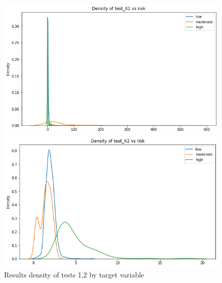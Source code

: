 \documentclass[a4paper]{article}
\begin{document}
\begin{figure}[ht]
\begin{minipage}[b]{0.45\linewidth}
\centering
\includegraphics[width=\textwidth]{Materials//Density Plots/test1.png}
\end{minipage}
\hspace{0.25cm}
\begin{minipage}[b]{0.45\linewidth}
\centering
\includegraphics[width=\textwidth]{Materials//Density Plots/test2.png}
\end{minipage}
\caption{Results density of tests 1,2 by target variable}
\label{fig: Density results tests 1,2}
\end{figure}
\end{document}
